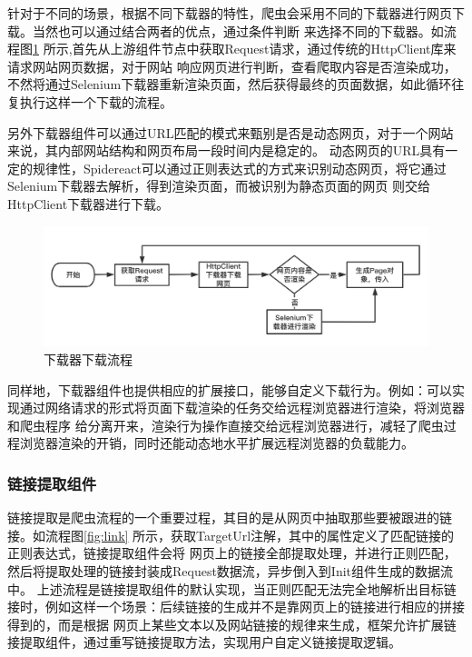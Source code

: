 \documentclass[master]{njuthesis}
\begin{document}
针对于不同的场景，根据不同下载器的特性，爬虫会采用不同的下载器进行网页下载。当然也可以通过结合两者的优点，通过条件判断
来选择不同的下载器。如流程图\ref{pic:downloader} 所示,首先从上游组件节点中获取Request请求，通过传统的HttpClient库来请求网站网页数据，对于网站
响应网页进行判断，查看爬取内容是否渲染成功，不然将通过Selenium下载器重新渲染页面，然后获得最终的页面数据，如此循环往复执行这样一个下载的流程。

另外下载器组件可以通过URL匹配的模式来甄别是否是动态网页，对于一个网站来说，其内部网站结构和网页布局一段时间内是稳定的。
动态网页的URL具有一定的规律性，Spidereact可以通过正则表达式的方式来识别动态网页，将它通过Selenium下载器去解析，得到渲染页面，而被识别为静态页面的网页
则交给HttpClient下载器进行下载。

\begin{figure}
\centering
\includegraphics[width=1\textwidth]{pic/downloader.png}
\caption{下载器下载流程}\label{pic:downloader}
\end{figure}

同样地，下载器组件也提供相应的扩展接口，能够自定义下载行为。例如：可以实现通过网络请求的形式将页面下载渲染的任务交给远程浏览器进行渲染，将浏览器和爬虫程序
给分离开来，渲染行为操作直接交给远程浏览器进行，减轻了爬虫过程浏览器渲染的开销，同时还能动态地水平扩展远程浏览器的负载能力。


\subsubsection{链接提取组件}
链接提取是爬虫流程的一个重要过程，其目的是从网页中抽取那些要被跟进的链接。如流程图\ref{fig:link} 所示，获取TargetUrl注解，其中的属性定义了匹配链接的正则表达式，链接提取组件会将
网页上的链接全部提取处理，并进行正则匹配，然后将提取处理的链接封装成Request数据流，异步倒入到Init组件生成的数据流中。
上述流程是链接提取组件的默认实现，当正则匹配无法完全地解析出目标链接时，例如这样一个场景：后续链接的生成并不是靠网页上的链接进行相应的拼接得到的，而是根据
网页上某些文本以及网站链接的规律来生成，框架允许扩展链接提取组件，通过重写链接提取方法，实现用户自定义链接提取逻辑。
\end{document}
